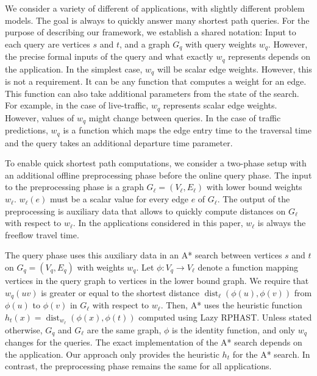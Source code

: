 \documentclass[manuscript,review]{acmart}
\newcommand*{\dist}{\operatorname{dist}}
\begin{document}

We consider a variety of different of applications, with slightly different problem models.
The goal is always to quickly answer many shortest path queries.
For the purpose of describing our framework, we establish a shared notation:
Input to each query are vertices $s$ and $t$, and a graph $G_q$ with query weights $w_q$.
However, the precise formal inputs of the query and what exactly $w_q$ represents depends on the application.
In the simplest case, $w_q$ will be scalar edge weights.
However, this is not a requirement.
It can be any function that computes a weight for an edge.
This function can also take additional parameters from the state of the search.
For example, in the case of live-traffic, $w_q$ represents scalar edge weights.
However, values of $w_q$ might change between queries.
In the case of traffic predictions, $w_q$ is a function which maps the edge entry time to the traversal time and the query takes an additional departure time parameter.

To enable quick shortest path computations, we consider a two-phase setup with an additional offline preprocessing phase before the online query phase.
The input to the preprocessing phase is a graph $G_\ell = (V_{\ell}, E_{\ell})$ with lower bound weights $w_\ell$.
$w_\ell(e)$ must be a scalar value for every edge $e$ of $G_\ell$.
The output of the preprocessing is auxiliary data that allows to quickly compute distances on $G_\ell$ with respect to $w_\ell$.
In the applications considered in this paper, $w_\ell$ is always the freeflow travel time.

The query phase uses this auxiliary data in an A* search between vertices $s$ and $t$ on $G_q = (V_q, E_q)$ with weights $w_q$.
Let $\phi : V_q \to V_{\ell}$ denote a function mapping vertices in the query graph to vertices in the lower bound graph.
We require that $w_q(u v)$ is greater or equal to the shortest distance $\dist_\ell(\phi(u), \phi(v))$ from $\phi(u)$ to $\phi(v)$ in $G_\ell$ with respect to $w_\ell$.
Then, A* uses the heuristic function $h_t(x) = \dist_{w_{\ell}}(\phi(x), \phi(t))$ computed using Lazy RPHAST.
Unless stated otherwise, $G_q$ and $G_\ell$ are the same graph, $\phi$ is the identity function, and only $w_q$ changes for the queries.
The exact implementation of the A* search depends on the application.
Our approach only provides the heuristic $h_t$ for the A* search.
In contrast, the preprocessing phase remains the same for all applications.
\end{document}
